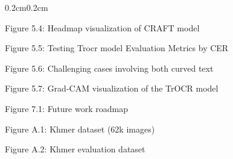 \begin{adjustwidth}{0.2cm}{0.2cm}
    {\large Figure 5.4: Headmap visualization of CRAFT model\dotfill\pageref{fig:headmap-craft-model-on-khmer}\hspace{0.1cm}\par}
    
    {\large Figure 5.5: Testing Trocr model Evaluation Metrics by CER\dotfill\pageref{fig:trocr_cer_log_result}\hspace{0.1cm}\par}
    
    {\large Figure 5.6: Challenging cases involving both curved text \dotfill\pageref{fig:test-case}\hspace{0.1cm}\par}
    
    {\large Figure 5.7: Grad-CAM visualization of the TrOCR model \dotfill\pageref{fig:grad-cam-trocr}\hspace{0.1cm}\par}
    
    {\large Figure 7.1: Future work roadmap\dotfill\pageref{fig:future_work}\hspace{0.1cm}\par}
    
    {\large Figure A.1: Khmer dataset (62k images)\dotfill\pageref{fig:khmer_ocr_hugginface_dataset}\hspace{0.1cm}\par}
    
    {\large Figure A.2: Khmer evaluation dataset\dotfill\pageref{fig:khmer_ocr_hugginface_dataset_2}\hspace{0.1cm}\par}

\end{adjustwidth}